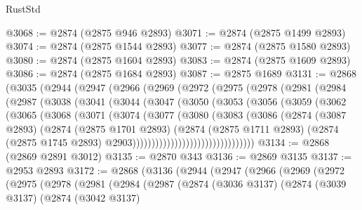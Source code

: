 \begin{lexlean}{RustStd}
\begin{coremodule}
{{{{{{{{{{{{{{{{{{{@3068 := @2874 (@2875 @946 @2893)
@3071 := @2874 (@2875 @1499 @2893)
@3074 := @2874 (@2875 @1544 @2893)
@3077 := @2874 (@2875 @1580 @2893)
@3080 := @2874 (@2875 @1604 @2893)
@3083 := @2874 (@2875 @1609 @2893)
@3086 := @2874 (@2875 @1684 @2893)
@3087 := @2875 @1689
@3131 := @2868
    (@3035
      (@2944
        (@2947
          (@2966
            (@2969
              (@2972
                (@2975
                  (@2978
                    (@2981
                      (@2984
                        (@2987
                          (@3038
                            (@3041
                              (@3044
                                (@3047
                                  (@3050
                                    (@3053
                                      (@3056
                                        (@3059
                                          (@3062
                                            (@3065
                                              (@3068
                                                (@3071
                                                  (@3074
                                                    (@3077
                                                      (@3080
                                                        (@3083
                                                          (@3086
                                                            (@2874
                                                              (@3087 @2893)
                                                              (@2874
                                                                (@2875 @1701 @2893)
                                                                (@2874
                                                                  (@2875 @1711 @2893)
                                                                  (@2874
                                                                    (@2875 @1745 @2893)
                                                                    @2903))))))))))))))))))))))))))))))))
@3134 := @2868 (@2869 @2891 @3012)
@3135 := @2870 @343
@3136 := @2869 @3135
@3137 := @2953 @2893
@3172 := @2868
    (@3136
      (@2944
        (@2947
          (@2966
            (@2969
              (@2972
                (@2975
                  (@2978
                    (@2981
                      (@2984
                        (@2987
                          (@2874
                            (@3036 @3137)
                            (@2874
                              (@3039 @3137)
                              (@2874
                                (@3042 @3137)
}}}}}}}}}}}}}}}}}}}
\end{coremodule}
\end{lexlean}
